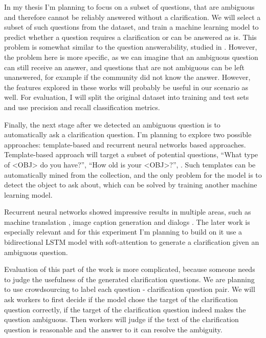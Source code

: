 In my thesis I'm planning to focus on a subset of questions, that are ambiguous and therefore cannot be reliably answered without a clarification.
We will select a subset of such questions from the dataset, and train a machine learning model to predict whether a question requires a clarification or can be answered as is.
This problem is somewhat similar to the question answerability, studied in \cite{dror2013will,shah2010evaluating}.
However, the problem here is more specific, as we can imagine that an ambiguous question can still receive an answer, and questions that are not ambiguous can be left unanswered, for example if the community did not know the answer.
However, the features explored in these works will probably be useful in our scenario as well.
For evaluation, I will split the original dataset into training and test sets and use precision and recall classification metrics.

Finally, the next stage after we detected an ambiguous question is to automatically ask a clarification question.
I'm planning to explore two possible approaches: template-based and recurrent neural networks based approaches.
Template-based approach will target a subset of potential questions, \eg ``What type of <OBJ> do you have?'', ``How old is your <OBJ>?'', \etc.
Such templates can be automatically mined from the collection, and the only problem for the model is to detect the object to ask about, which can be solved by training another machine learning model.

Recurrent neural networks showed impressive results in multiple areas, such as machine translation \cite{sutskever2014sequence}, image caption generation \cite{vinyals2015show} and dialogs \cite{vinyals2015neural}.
The later work is especially relevant and for this experiment I'm planning to build on it use a bidirectional LSTM model with soft-attention to generate a clarification given an ambiguous question.

Evaluation of this part of the work is more complicated, because someone needs to judge the usefulness of the generated clarification questions.
We are planning to use crowdsourcing to label each question - clarification question pair.
We will ask workers to first decide if the model chose the target of the clarification question correctly, \ie if the target of the clarification question indeed makes the question ambiguous.
Then workers will judge if the text of the clarification question is reasonable and the answer to it can resolve the ambiguity.

